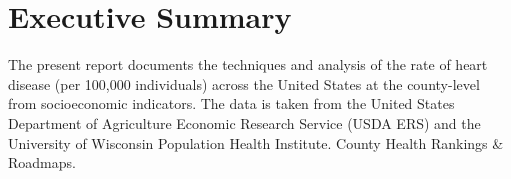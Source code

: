 \documentclass[
10pt, %
a4paper, %
oneside, %
headinclude,footinclude, %
BCOR5mm, %
]{scrartcl}
\title{\normalfont\spacedallcaps{Predicting Heart Disease Mortality}} %
\author{\spacedlowsmallcaps{Carlos Alberto Nava Fonseca\textsuperscript{1}}} %
\date{} %
\begin{document}

\renewcommand{\sectionmark}[1]{\markright{\spacedlowsmallcaps{#1}}} %
\lehead{\mbox{\llap{\small\thepage\kern1em\color{halfgray} \vline}\color{halfgray}\hspace{0.5em}\rightmark\hfil}} %

\pagestyle{scrheadings} %


\maketitle %

\setcounter{tocdepth}{2} %

\tableofcontents %

\listoffigures %

\listoftables %


\section*{Executive Summary} %

The present report documents the techniques and analysis of the rate of heart disease (per 100,000 individuals) across the United States at the county-level from socioeconomic indicators. The data is taken from the United States Department of Agriculture Economic Research Service (USDA ERS) and the University of Wisconsin Population Health Institute. County Health Rankings \& Roadmaps.
\end{document}
